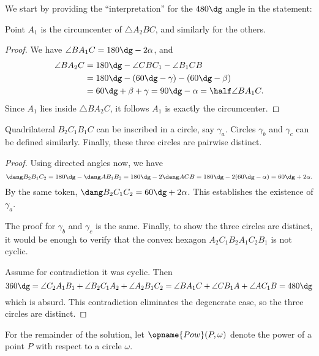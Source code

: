 We start by providing the ``interpretation'' for the $480\dg$ angle in the statement:
\begin{claim*}
  Point $A_1$ is the circumcenter of $\triangle A_2BC$, and similarly for the others.
\end{claim*}
\begin{proof}
  We have $\angle BA_1C = 180\dg - 2\alpha$, and
  \begin{align*}
    \angle BA_2C &= 180\dg - \angle CBC_1 - \angle B_1CB \\
    &= 180\dg - \left( 60\dg - \gamma \right) - \left( 60\dg - \beta \right) \\
    &= 60\dg + \beta + \gamma = 90\dg - \alpha = \half \angle BA_1 C.
  \end{align*}
  Since $A_1$ lies inside $\triangle BA_2C$, it follows $A_1$ is exactly the circumcenter.
\end{proof}

\begin{claim*}
  Quadrilateral $B_2C_1B_1C$ can be inscribed in a circle, say $\gamma_a$.
  Circles $\gamma_b$ and $\gamma_c$ can be defined similarly.
  Finally, these three circles are pairwise distinct.
\end{claim*}
\begin{proof}
  Using directed angles now, we have
  \[ \dang B_2B_1C_2 = 180\dg-\dang AB_1B_2
    = 180\dg - 2 \dang ACB = 180\dg-2(60\dg-\alpha) = 60\dg+2\alpha. \]
  By the same token, $\dang B_2C_1C_2 = 60\dg+2\alpha$.
  This establishes the existence of $\gamma_a$.

  The proof for $\gamma_b$ and $\gamma_c$ is the same.
  Finally, to show the three circles are distinct, it would be enough to
  verify that the convex hexagon $A_2C_1B_2A_1C_2B_1$ is not cyclic.

  Assume for contradiction it was cyclic. Then
  \[ 360\dg = \angle C_2A_1B_1 + \angle B_2C_1A_2 + \angle A_2B_1C_2
    = \angle BA_1C + \angle CB_1A + \angle AC_1B = 480\dg \]
  which is absurd.
  This contradiction eliminates the degenerate case, so the three circles are distinct.
\end{proof}

For the remainder of the solution, let $\opname{Pow}(P, \omega)$
denote the power of a point $P$ with respect to a circle $\omega$.

